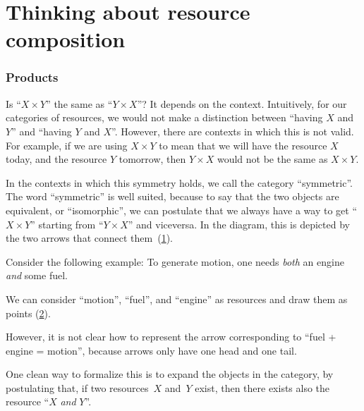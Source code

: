 \section{Thinking about resource composition}
\subsubsection{Products}
Is ``$X \times Y$'' the same as ``$Y \times X$''?
It depends on the context. Intuitively, for our categories of resources, we would not make a distinction
between ``having $X$ and $Y$'' and ``having $Y$ and $X$''.
However, there are contexts in which this is not valid. For example, if we are
using $X \times Y$ to mean that we will have the resource $X$ today, and the
resource $Y$ tomorrow, then $Y \times X$ would not be the same as $X \times Y$.

In the contexts in which this symmetry holds, we call the category ``symmetric''.
The word ``symmetric'' is well suited, because to say that the two objects are equivalent,
or ``isomorphic'', we can postulate that we always have a way to get
``$X \times Y$'' starting from ``$Y \times X$'' and viceversa. In the diagram, this is depicted
by the two arrows that connect them~(\cref{fig:e17}).

\begin{figure}[h!]
    \centering
    \caption{\label{fig:e17}}
\end{figure}

Consider the following example: To generate motion, one needs \emph{both} an engine \emph{and} some fuel.

We can consider ``motion'', ``fuel'', and ``engine'' as resources and draw them as points (\cref{fig:e11}).

\begin{figure}[h!]
    \centering
    \caption{\label{fig:e11}}
\end{figure}

However, it is not clear how to represent the arrow corresponding to
``fuel + engine = motion'', because arrows only have one head and
one tail.

One clean way to formalize this is to expand the objects in the category,
by postulating that,
if two resources~$X$ and~$Y$ exist, then there exists also the
resource ``$X$ \emph{and} $Y$''.


